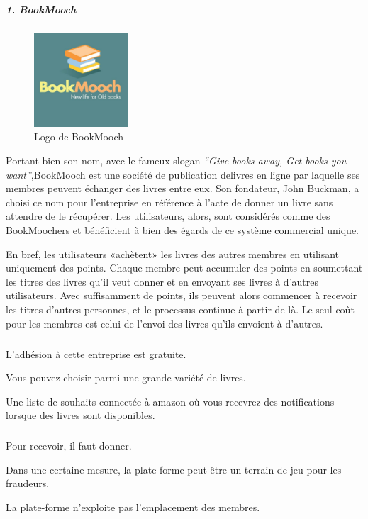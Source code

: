 \subparagraph{{\large 1. BookMooch}\medskip \\}

\begin{figure}
	\vspace{10pt}
	\includegraphics[width=3.5cm]{Images/chapter1/bookMoochLogo.jpg}
	\vspace{-20pt}
	\caption{{\footnotesize Logo de BookMooch}}
\end{figure}

Portant bien son nom, avec le fameux slogan \textit{​“Give books away, Get books you want”},BookMooch est une société de publication delivres en ligne par laquelle ses membres peuvent échanger des livres entre eux. Son fondateur,
John Buckman, a choisi ce nom pour l'entreprise en référence à l'acte de donner un livre sans attendre de le récupérer. Les utilisateurs, alors, sont considérés comme des BookMoochers et bénéficient à bien des égards de ce système commercial unique.

En bref, les utilisateurs «achètent» les livres des autres membres	en utilisant uniquement des points. Chaque membre peut accumuler des points en soumettant les titres des livres qu'il veut donner et en envoyant ses livres à d'autres utilisateurs. Avec suffisamment de points, ils peuvent alors commencer à recevoir les titres d'autres personnes, et le processus continue à partir de là. Le seul coût pour les membres est celui de l'envoi des livres qu'ils envoient à d'autres.\cite{noauthor_bookmooch_nodate}\\

\subparagraph*{}
\begin{list}{•}{\textbf{Avantages}}
	\item L'adhésion à cette entreprise est gratuite.
	\item Vous pouvez choisir parmi une grande variété de livres.
	\item Une liste de souhaits connectée à amazon où vous recevrez des notifications lorsque des livres sont disponibles.
\end{list}

\subparagraph*{}
\begin{list}{•}{\textbf{Inconvénients}}
	\item Pour recevoir, il faut donner.
	\item Dans une certaine mesure, la plate-forme peut être un terrain de jeu pour les fraudeurs.
	\item La plate-forme n'exploite pas l'emplacement des membres.
\end{list}


